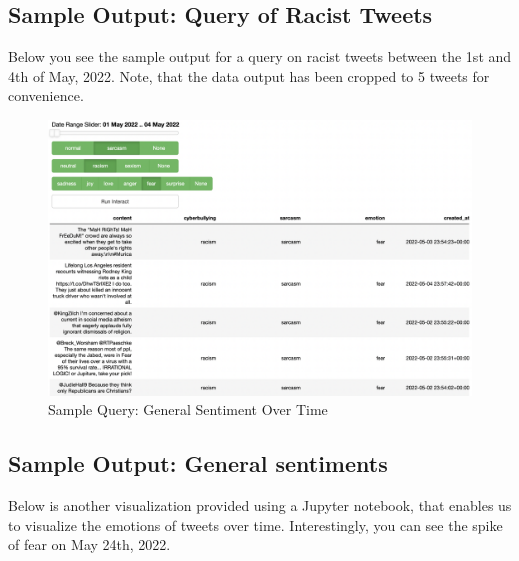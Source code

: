 \documentclass[a4paper,12pt]{article}
\begin{document}
\subsection{Sample Output: Query of Racist Tweets}
Below you see the sample output for a query on racist tweets between the 1st and 4th of May, 2022. Note, that the data output
has been cropped to 5 tweets for convenience.

\begin{figure}[h!]
\centering
\includegraphics[width=\textwidth]{racism.png}
\caption{Sample Query: General Sentiment Over Time}
\label{fig:Query-Racist-Tweets}
\end{figure}

\subsection{Sample Output: General sentiments}
Below is another visualization provided using a Jupyter notebook, that enables us to visualize the emotions of tweets over time.
Interestingly, you can see the spike of fear on May 24th, 2022.
\end{document}
